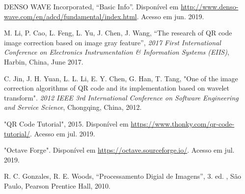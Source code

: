 \documentclass{ceel}
\begin{document}
\begin{multicols}{2}
\begin{thebibliography}{9} %

    DENSO WAVE Incorporated,
    “Basic Info”. 
    Disponível em \url{http://www.denso-wave.com/en/adcd/fundamental/index.html}. Acesso em jun. 2019.

  M. Li, P. Cao, L. Feng, L. Yu, J. Chen, J. Wang,
   “The research of QR code image correction based on image gray feature”,
   \emph{ 2017 First International Conference on Electronics Instrumentation \& Information Systems (EIIS)}, Harbin, China, June 2017.

C. Jin, J. H. Yuan, L. L. Li, E. Y. Chen, G. Han, T. Tang, 
"One of the image correction algorithms of QR code and its implementation
based on wavelet transform".
\emph{2012 IEEE 3rd International Conference on
Software Engineering and Service Science}, Chongqing, China, 2012.


	"QR Code Tutorial", 2015.
	Disponível em \url{https://www.thonky.com/qr-code-tutorial/}. Acesso em jul. 2019.

"Octave Forge". 
Disponível em \url{https://octave.sourceforge.io/}. Acesso em jul. 2019.

    R. C. Gonzales, R. E. Woods,
    “Processamento Digial de Imagens”, 
    3. ed. , São Paulo, Pearson Prentice Hall, 2010.

\end{thebibliography}


\end{multicols}
\end{document}
